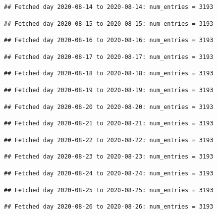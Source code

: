 \documentclass[]{article}
\begin{document}
\begin{verbatim}
## Fetched day 2020-08-14 to 2020-08-14: num_entries = 3193
\end{verbatim}

\begin{verbatim}
## Fetched day 2020-08-15 to 2020-08-15: num_entries = 3193
\end{verbatim}

\begin{verbatim}
## Fetched day 2020-08-16 to 2020-08-16: num_entries = 3193
\end{verbatim}

\begin{verbatim}
## Fetched day 2020-08-17 to 2020-08-17: num_entries = 3193
\end{verbatim}

\begin{verbatim}
## Fetched day 2020-08-18 to 2020-08-18: num_entries = 3193
\end{verbatim}

\begin{verbatim}
## Fetched day 2020-08-19 to 2020-08-19: num_entries = 3193
\end{verbatim}

\begin{verbatim}
## Fetched day 2020-08-20 to 2020-08-20: num_entries = 3193
\end{verbatim}

\begin{verbatim}
## Fetched day 2020-08-21 to 2020-08-21: num_entries = 3193
\end{verbatim}

\begin{verbatim}
## Fetched day 2020-08-22 to 2020-08-22: num_entries = 3193
\end{verbatim}

\begin{verbatim}
## Fetched day 2020-08-23 to 2020-08-23: num_entries = 3193
\end{verbatim}

\begin{verbatim}
## Fetched day 2020-08-24 to 2020-08-24: num_entries = 3193
\end{verbatim}

\begin{verbatim}
## Fetched day 2020-08-25 to 2020-08-25: num_entries = 3193
\end{verbatim}

\begin{verbatim}
## Fetched day 2020-08-26 to 2020-08-26: num_entries = 3193
\end{verbatim}
\end{document}
